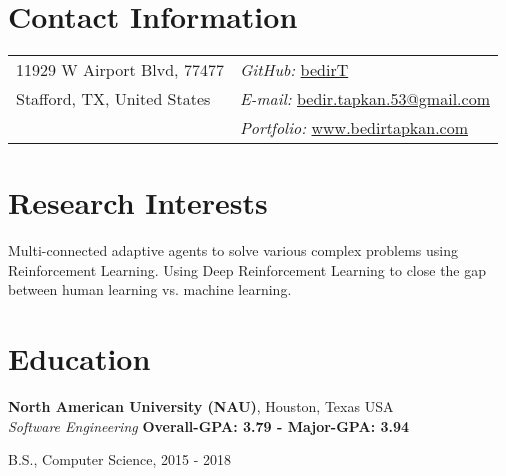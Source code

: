\documentclass[margin,line]{res}
\newenvironment{list1}{
	\begin{list}{\ding{113}}{%
			\setlength{\itemsep}{0in}
			\setlength{\parsep}{0in} \setlength{\parskip}{0in}
			\setlength{\topsep}{0in} \setlength{\partopsep}{0in} 
			\setlength{\leftmargin}{0.17in}}}{\end{list}}
\newenvironment{list2}{
	\begin{list}{$\bullet$}{%
			\setlength{\itemsep}{0in}
			\setlength{\parsep}{0in} \setlength{\parskip}{0in}
			\setlength{\topsep}{0in} \setlength{\partopsep}{0in} 
			\setlength{\leftmargin}{0.2in}}}{\end{list}}
\begin{document}
	
	
	\begin{resume}
		\section{\sc Contact Information}
		\vspace{.05in}
		\begin{tabular}{@{}p{2in}p{4in}}
			11929 W Airport Blvd, 77477 & \hfill {\it GitHub:}  \href{https://github.com/bedirT}{bedirT} \\
			Stafford, TX, United States & \hfill {\it E-mail:}  \href{mailto:bedir.tapkan.53@gmail.com}{bedir.tapkan.53@gmail.com}\\
			& \hfill {\it Portfolio:}  \href{www.bedirtapkan.com}{www.bedirtapkan.com} \\
		\end{tabular}
		
		
		\section{\sc Research Interests}
		Multi-connected adaptive agents to solve various complex problems using Reinforcement Learning. Using Deep Reinforcement Learning to close the gap between human learning vs. machine learning.
		
		\section{\sc Education}
		
		
		{\bf North American University (NAU)}, Houston, Texas USA\\
		{\em Software Engineering}  \hfill {\bf Overall-GPA: 3.79 - Major-GPA: 3.94}\\
		\vspace{-.3cm}
		\begin{list1}
			\item[] B.S., Computer Science,  2015 - 2018
		\end{list1}
		

\end{resume}
\end{document}
